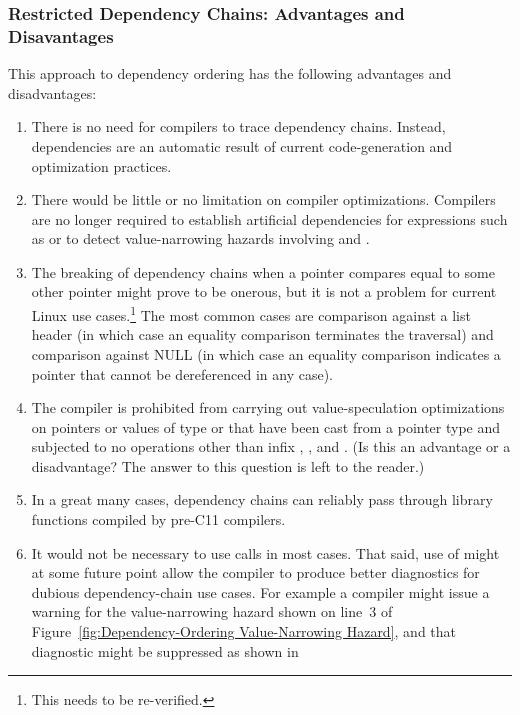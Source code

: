 \documentclass[letterpaper,twocolumn,10pt]{article}
\begin{document}
\subsubsection{Restricted Dependency Chains: Advantages and Disavantages}
\label{sec:Restricted Dependency Chains: Advantages and Disavantages}

This approach to dependency ordering has the following advantages and
disadvantages:

\begin{enumerate}
\item	There is no need for compilers to trace dependency chains.
	Instead, dependencies are an automatic result of current
	code-generation and optimization practices.
\item	There would be little or no limitation on compiler optimizations.
	Compilers are no longer required to establish artificial
	dependencies for expressions such as  or to
	detect value-narrowing hazards involving \co{==} and \co{!=}.
\item	The breaking of dependency chains when a pointer compares equal
	to some other pointer might prove to be onerous, but it is not
	a problem for current Linux use cases.\footnote{
		This needs to be re-verified.}
	The most common cases are comparison against a list header (in
	which case an equality comparison terminates the traversal)
	and comparison against NULL (in which case an equality comparison
	indicates a pointer that cannot be dereferenced in any case).
\item	The compiler is prohibited from carrying out value-speculation
	optimizations on pointers or values of type 
	or  that have been cast from a pointer type
	and subjected to no operations other than infix \co{&}, \co{|},
	and \co{^}.
	(Is this an advantage or a disadvantage?
	The answer to this question is left to the reader.)
\item	In a great many cases, dependency chains can reliably pass through
	library functions compiled by pre-C11 compilers.
\item	It would not be necessary to use  calls
	in most cases.
	That said, use of  might at some
	future point allow the compiler to produce better diagnostics
	for dubious dependency-chain use cases.
	For example a compiler might issue a warning for the value-narrowing
	hazard shown on line~3 of
	Figure~\ref{fig:Dependency-Ordering Value-Narrowing Hazard},
	and that diagnostic might be suppressed as shown in

\end{enumerate}
\end{document}
